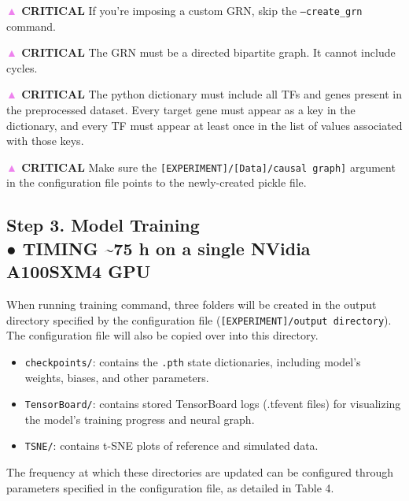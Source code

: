 \begin{tcolorbox}
\textbf{\textcolor{violet}{▲} CRITICAL} If you’re imposing a custom GRN, skip the \texttt{--create\_grn} command.

\textbf{\textcolor{violet}{▲} CRITICAL} The GRN must be a directed bipartite graph. It cannot include cycles. 

\textbf{\textcolor{violet}{▲} CRITICAL} The python dictionary must include all TFs and genes present in the preprocessed
dataset. Every target gene must appear as a key in the dictionary, and every TF must appear at
least once in the list of values associated with those keys.

\textbf{\textcolor{violet}{▲} CRITICAL} Make sure the \texttt{[EXPERIMENT]/[Data]/causal graph]} argument in the
configuration file points to the newly-created pickle file.

\subsection*{Step 3. Model Training\\● TIMING \textasciitilde 75 h on a single NVidia A100SXM4 GPU}

When running training command, three folders will be created in the output directory specified
by the configuration file (\texttt{[EXPERIMENT]/output directory}). The configuration file will also
be copied over into this directory. 
\begin{itemize}
  \item \texttt{checkpoints/}: contains the \texttt{.pth} state dictionaries, including model’s weights, biases,
and other parameters.
  \item \texttt{TensorBoard/}: contains stored TensorBoard logs (.tfevent files) for visualizing the
model’s training progress and neural graph. 
  \item \texttt{TSNE/}: contains t-SNE plots of reference and simulated data. 
\end{itemize}
The frequency at which these directories are updated can be configured through parameters
specified in the configuration file, as detailed in Table 4.


\end{tcolorbox}
